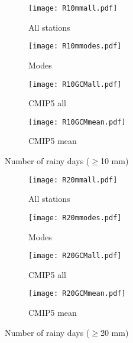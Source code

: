 \documentclass{article}
\begin{document}
	\begin{figure}[H]
		\centering
		\begin{subfigure}{0.5\textwidth}
			\centering
			\texttt{[image: R10mmall.pdf]}
			\caption{All stations}
		\end{subfigure}%
		\begin{subfigure}{0.5\textwidth}
			\centering
			\texttt{[image: R10mmodes.pdf]}
			\caption{Modes}
		\end{subfigure}
		\begin{subfigure}{0.5\textwidth}
			\centering
			\texttt{[image: R10GCMall.pdf]}
			\caption{CMIP5 all}
		\end{subfigure}%
		\begin{subfigure}{0.5\textwidth}
			\centering
			\texttt{[image: R10GCMmean.pdf]}
			\caption{CMIP5 mean}
		\end{subfigure}
		\caption{Number of rainy days ($\geq$10 mm)}
		\label{R10mm}
	\end{figure}

	\begin{figure}[H]
		\centering
		\begin{subfigure}{0.5\textwidth}
			\centering
			\texttt{[image: R20mmall.pdf]}
			\caption{All stations}
		\end{subfigure}%
		\begin{subfigure}{0.5\textwidth}
			\centering
			\texttt{[image: R20mmodes.pdf]}
			\caption{Modes}
		\end{subfigure}
		\begin{subfigure}{0.5\textwidth}
			\centering
			\texttt{[image: R20GCMall.pdf]}
			\caption{CMIP5 all}
		\end{subfigure}%
		\begin{subfigure}{0.5\textwidth}
			\centering
			\texttt{[image: R20GCMmean.pdf]}
			\caption{CMIP5 mean}
		\end{subfigure}
		\caption{Number of rainy days ($\geq$20 mm)}
		\label{R20mm}
	\end{figure}
\end{document}
